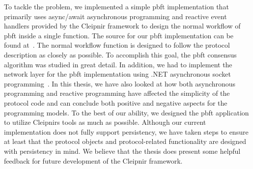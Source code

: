 \fi

To tackle the problem, we implemented a simple \ac{pbft} implementation that primarily uses async/await asynchronous programming and reactive event handlers provided by the Cleipnir framework to design the normal workflow of \ac{pbft} inside a single function. The source for our \ac{pbft} implementation can be found at~\cite{WEB:pbftmast}. The normal workflow function is designed to follow the protocol description as closely as possible. To accomplish this goal, the \ac{pbft} consensus algorithm was studied in great detail. In addition, we had to implement the network layer for the \ac{pbft} implementation using .NET asynchronous socket programming~\cite{DOC:AsyncSocketProg, VIDEO:dotnetsocketprog}. In this thesis, we have also looked at how both asynchronous programming and reactive programming have affected the simplicity of the protocol code and can conclude both positive and negative aspects for the programming models. To the best of our ability, we designed the \ac{pbft} application to utilize Cleipnirs tools as much as possible. Although our current implementation does not fully support persistency, we have taken steps to ensure at least that the protocol objects and protocol-related functionality are designed with persistency in mind. We believe that the thesis does present some helpful feedback for future development of the Cleipnir framework.

